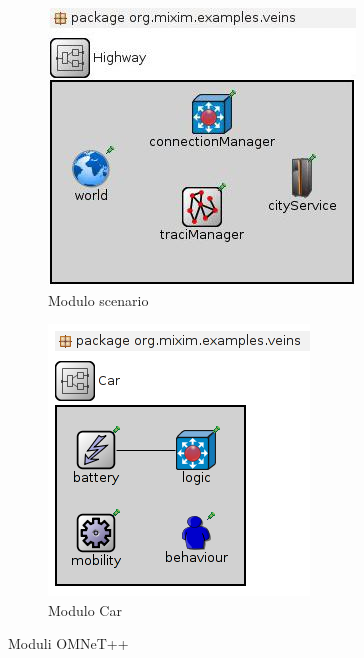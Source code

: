\begin{figure}
        \centering
		\begin{subfigure}[H]{0.45\textwidth}
                \includegraphics[width=\textwidth]{assets/module-scenario.jpg}
                \caption{Modulo scenario}
                \label{fig:module-car}
        \end{subfigure}
        \qquad
        \begin{subfigure}[H]{0.45\textwidth}
                \includegraphics[width=\textwidth]{assets/module-car.png}
                \caption{Modulo Car}
                \label{fig:module-scenario}
        \end{subfigure}%
        \caption{Moduli OMNeT++}
\end{figure}

